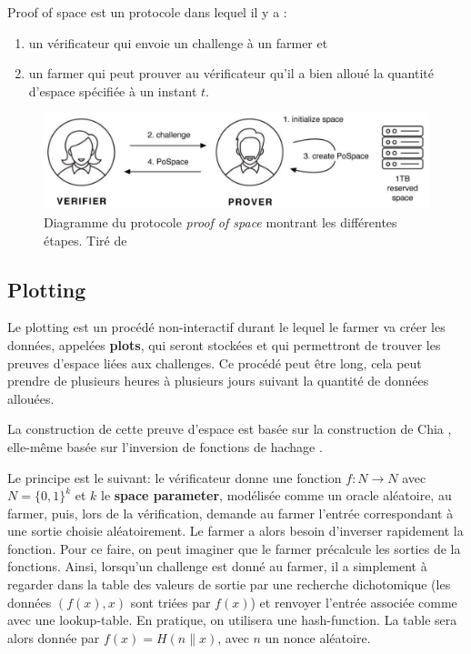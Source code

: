 Proof of space est un protocole dans lequel il y a :

\begin{enumerate}
  \item un vérificateur qui envoie un challenge à un farmer et
  \item un farmer qui peut prouver au vérificateur qu'il a bien alloué la quantité d'espace spécifiée à un instant $t$.
\end{enumerate}

\begin{figure}[H]
  \centering
  \includegraphics[width=\textwidth]{images/pospace.png}
  \caption{Diagramme du protocole \emph{proof of space} montrant les différentes étapes. Tiré de \cite{chia:consensus}}
\end{figure}

\subsection{Plotting}

Le plotting est un procédé non-interactif durant le lequel le farmer va créer les données, appelées \textbf{plots}, qui seront stockées et qui permettront de trouver les preuves d'espace liées aux challenges. Ce procédé peut être long, cela peut prendre de plusieurs heures à plusieurs jours suivant la quantité de données allouées.

La construction de cette preuve d'espace est basée sur la construction de Chia \cite{chia:construction}, elle-même basée sur l'inversion de fonctions de hachage \cite{DBLP:conf/asiacrypt/AbusalahACKPR17}.

Le principe est le suivant: le vérificateur donne une fonction $f: N \rightarrow N$ avec $N = \{0,1\}^k$ et $k$ le \textbf{space parameter}, modélisée comme un oracle aléatoire, au farmer, puis, lors de la vérification, demande au farmer l'entrée correspondant à une sortie choisie aléatoirement. Le farmer a alors besoin d'inverser rapidement la fonction. Pour ce faire, on peut imaginer que le farmer précalcule les sorties de la fonctions. Ainsi, lorsqu'un challenge est donné au farmer, il a simplement à regarder dans la table des valeurs de sortie par une recherche dichotomique (les données $(f(x), x)$ sont triées par $f(x)$) et renvoyer l'entrée associée comme avec une lookup-table. En pratique, on utilisera une \gls{hash-function}. La table sera alors donnée par $f(x) = H(n\|x)$, avec $n$ un nonce aléatoire.

